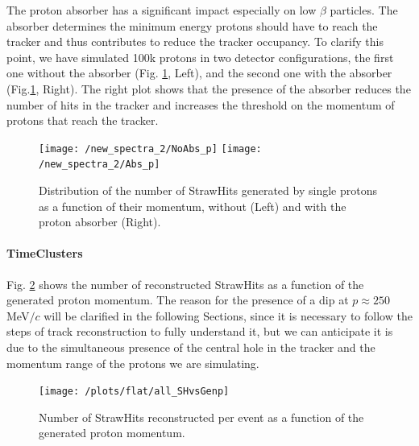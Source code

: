 \documentclass[12pt,a4paper,openright, oneside, titlepage]{book} %
\begin{document}
\noindent 
The proton absorber has a significant impact especially on low $\beta$ particles. 
The absorber determines the minimum energy protons should have to reach the tracker
and thus contributes to reduce the tracker occupancy.
To clarify this point, we have simulated 100k protons in two detector configurations, the first one without the absorber  (Fig. \ref{_proton_absorber}, Left), and the second one with the absorber (Fig.\ref{_proton_absorber}, Right). 
The right plot shows that the presence of the absorber reduces the number of hits in the tracker and increases the threshold on the momentum of protons that reach the tracker.


\begin{figure}[!htb]
\centering
\texttt{[image: /new\_spectra\_2/NoAbs\_p]}\hfill
\texttt{[image: /new\_spectra\_2/Abs\_p]}
\caption[StrawHits with and without proton absorber]
{Distribution of the number of StrawHits generated by single protons as a function of their momentum, without (Left) and with the proton absorber (Right).}
\label{_proton_absorber}
\end{figure}

\paragraph{TimeClusters} 
Fig. \ref{_all_SHvsGenp} shows the number of reconstructed StrawHits as a function of the generated proton momentum.
The reason for the presence of a dip at $p\approx 250$ MeV$/c$ will be clarified in the following Sections, since it is necessary to follow the steps of track reconstruction to fully understand it, but we can anticipate it is due to the simultaneous presence of the central hole in the tracker and the momentum range of the protons we are simulating.

\begin{figure}[!htb]
\centering
\texttt{[image: /plots/flat/all\_SHvsGenp]}
\caption[Number of StrawHits per event]{Number of StrawHits reconstructed per event as a function of the generated proton momentum.}
\label{_all_SHvsGenp}
\end{figure}
\end{document}
